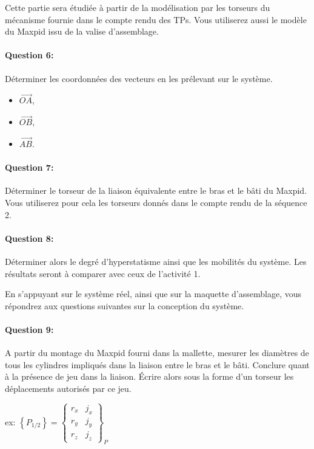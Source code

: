 \cleardoublepage


Cette partie sera étudiée à partir de la modélisation par les torseurs du mécanisme fournie dans le compte rendu des TPs. Vous utiliserez aussi le modèle du Maxpid issu de la valise d'assemblage.

\paragraph{Question 6:} Déterminer les coordonnées des vecteurs en les prélevant sur le système.
\begin{itemize}
 \item $\overrightarrow{OA}$,
 \item $\overrightarrow{OB}$,
 \item $\overrightarrow{AB}$.
\end{itemize}

\paragraph{Question 7:} Déterminer le torseur de la liaison équivalente entre le bras et le bâti du Maxpid. Vous utiliserez pour cela les torseurs donnés dans le compte rendu de la séquence 2.

\paragraph{Question 8:} Déterminer alors le degré d'hyperstatisme ainsi que les mobilités du système. Les résultats seront à comparer avec ceux de l'activité 1.

\cleardoublepage


En s'appuyant sur le système réel, ainsi que sur la maquette d'assemblage, vous répondrez aux questions suivantes sur la conception du système.

\paragraph{Question 9:} A partir du montage du Maxpid fourni dans la mallette, mesurer les diamètres de tous les cylindres impliqués dans la liaison entre le bras et le bâti. Conclure quant à la présence de jeu dans la liaison. Écrire alors sous la forme d'un torseur les déplacements autorisés par ce jeu.

ex:
$\left\{P_{1/2}\right\}=\left\{ \begin{array}{cc} r_x & j_x \\ r_y & j_y \\ r_z & j_z \end{array}\right\}_{P}$

